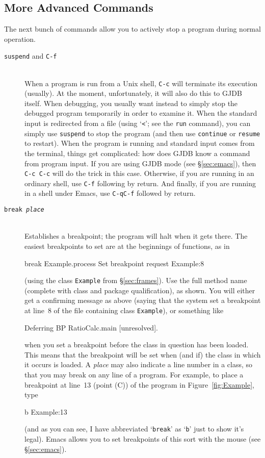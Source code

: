 \documentclass[11pt,twoside]{handout}
\begin{document}
\subsection{More Advanced Commands}

The next bunch of commands allow you to actively stop a program during
normal operation.
\begin{description}
\item[{\tt suspend} and {\tt C-f}] ~\\
When a program is run from a Unix shell,  {\tt C-c} will terminate
its execution (usually).  At the moment, unfortunately, it will
also do this to GJDB itself.  When debugging, you usually want instead
to simply stop the debugged program temporarily in order to examine it. 
When the standard input is redirected from a file (using `{\tt<}'; see 
the {\tt run} command), you can simply use {\tt suspend} to stop the
program (and then use {\tt continue} or {\tt resume} to restart).  
When the program is running and standard input comes from the
terminal, things get complicated: how does GJDB know a command from
program input.  If you are using GJDB mode (see \S\ref{sec:emacs}),
then {\tt C-c C-c} will do the trick in this case.
Otherwise, if you are running in an ordinary shell, use {\tt C-f}
following by return.  And finally, if you are running in a shell under
Emacs, use {\tt C-qC-f} followed by return.
\item[\tt break {\it place}] \ \\
Establishes a breakpoint; the program will halt when it gets there.
The easiest breakpoints to set are at the beginnings of functions, as
in
\begin{program}
[-] break Example.process
Set breakpoint request Example:8
\end{program}
(using the class {\tt Example} from \S\ref{sec:frames}).  Use the
full method name (complete with class and package qualification), as
shown.  You will
either get a confirming message as above (saying that the system set a
breakpoint at line~8 of the file containing class {\tt Example}),
or something like 
\begin{program}
Deferring BP RatioCalc.main [unresolved].
\end{program}
when you set a breakpoint before the class in question has been
loaded.  
This means that the breakpoint will be set when (and if) the class in which
it occurs is loaded.
A {\it place\/} may also indicate a line number in a class, 
so that you may break
on any line of a program.  For example, to place a breakpoint at
line~13  (point (C)) of the program
in Figure~\ref{fig:Example}, type
\begin{program}
[-] b Example:13
\end{program}
(and as you can see, I have abbreviated `{\tt break}' as `{\tt b}'
just to show it's legal).
Emacs allows you to set breakpoints of this sort 
with the mouse (see \S\ref{sec:emacs}).


\end{description}
\end{document}

